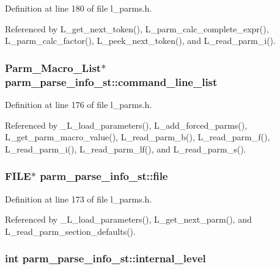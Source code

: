 Definition at line 180 of file l\_\-parms.h.

Referenced by L\_\-get\_\-next\_\-token(), L\_\-parm\_\-calc\_\-complete\_\-expr(), L\_\-parm\_\-calc\_\-factor(), L\_\-peek\_\-next\_\-token(), and L\_\-read\_\-parm\_\-i().
\subsubsection{\setlength{\rightskip}{0pt plus 5cm}\bf{Parm\_\-Macro\_\-List}$\ast$ \bf{parm\_\-parse\_\-info\_\-st::command\_\-line\_\-list}}\label{structparm__parse__info__st_9bed9131e54df85ba3dacc6e598386cb}




Definition at line 176 of file l\_\-parms.h.

Referenced by \_\-L\_\-load\_\-parameters(), L\_\-add\_\-forced\_\-parms(), L\_\-get\_\-parm\_\-macro\_\-value(), L\_\-read\_\-parm\_\-b(), L\_\-read\_\-parm\_\-f(), L\_\-read\_\-parm\_\-i(), L\_\-read\_\-parm\_\-lf(), and L\_\-read\_\-parm\_\-s().
\subsubsection{\setlength{\rightskip}{0pt plus 5cm}FILE$\ast$ \bf{parm\_\-parse\_\-info\_\-st::file}}\label{structparm__parse__info__st_6155e6a99d067e72711907b6b38c8860}




Definition at line 173 of file l\_\-parms.h.

Referenced by \_\-L\_\-load\_\-parameters(), L\_\-get\_\-next\_\-parm(), and L\_\-read\_\-parm\_\-section\_\-defaults().
\subsubsection{\setlength{\rightskip}{0pt plus 5cm}int \bf{parm\_\-parse\_\-info\_\-st::internal\_\-level}}\label{structparm__parse__info__st_22828bed68ce338415b8382c07077278}




